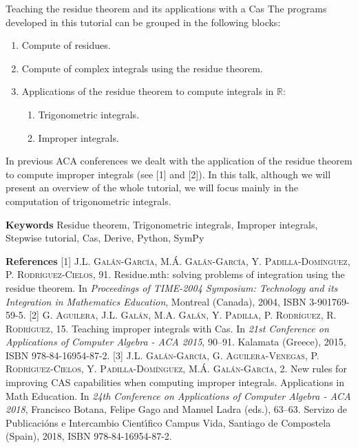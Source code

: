 \begin{abstract_online}{Teaching the residue theorem and its applications with a {\sc Cas}}
The programs developed in this tutorial can be grouped in the following blocks:
\begin{enumerate}
\item Compute of residues.
\item Compute of complex integrals using the residue theorem.
\item Applications of the residue theorem to compute integrals in $\mathbb{R}$:
\begin{enumerate}
\item Trigonometric integrals.
\item Improper integrals.
\end{enumerate}
\end{enumerate}
In previous ACA conferences we dealt with the application of the residue theorem to compute improper integrals (see [1] and [2]). In this talk, although we will present an overview of the whole tutorial, we will focus mainly in the computation of trigonometric integrals. 


\textbf{Keywords} \newline{} Residue theorem, Trigonometric integrals, Improper integrals, Stepwise tutorial, {\sc Cas}, {\sc Derive}, {\sc Python}, {\sc SymPy}

\textbf{References} \newline{}
[1] \textsc{J.L. Gal\'an-Garc\'{\i}a, M.\'A. Gal\'an-Garc\'{\i}a, Y. Padilla-Dom\'{\i}nguez, P. Rodr\'{\i}guez-Cielos}, 91.	Residue.mth: solving problems of integration using the residue theorem. In \emph{Proceedings of TIME-2004 Symposium: Technology and its Integration in Mathematics Education}, Montreal (Canada), 2004, ISBN 3-901769-59-5. \newline{}
[2] \textsc{G. Aguilera, J.L. Galán, M.A. Galán, Y. Padilla, P. Rodríguez, R. Rodríguez}, 15.	Teaching improper integrals with {\sc Cas}. In \emph{21st Conference on Applications of Computer Algebra - ACA 2015}, 90--91. Kalamata (Greece), 2015, ISBN 978-84-16954-87-2. \newline{}
[3] \textsc{J.L. Gal\'an-Garc\'{\i}a, G. Aguilera-Venegas, P. Rodr\'{\i}guez-Cielos, Y. Padilla-Dom\'{\i}nguez, M.\'A. Gal\'an-Garc\'{\i}a}, 2.	New rules for improving CAS capabilities when computing improper integrals. Applications in Math Education. In \emph{24th Conference on Applications of Computer Algebra - ACA 2018}, Francisco Botana, Felipe Gago and Manuel Ladra (eds.), 63--63. Servizo de Publicaci\'ons e Intercambio Cient\'{\i}fico Campus Vida, Santiago de Compostela (Spain), 2018, ISBN 978-84-16954-87-2. \newline{}
\end{abstract_online}
    